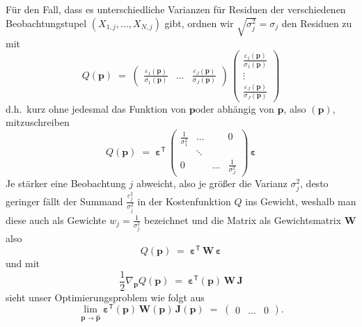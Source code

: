 Für den Fall, dass es unterschiedliche Varianzen für Residuen der verschiedenen Beobachtungstupel
$(X_{1,j},\dots,X_{N,j})$ gibt, ordnen wir $\sqrt{\sigma_j^2} = \sigma_j$ 
den Residuen zu mit
\begin{equation}
Q(\mathbf{p}) \; = \;
  \left(\begin{array}{ccc}
  \frac{\varepsilon_1(\mathbf{p})}{\sigma_1(\mathbf{p})} & \dots &
 \frac{\varepsilon_J(\mathbf{p})}{\sigma_J(\mathbf{p})} \end{array} \right)
\, \left(\begin{array}{c} \frac{\varepsilon_1(\mathbf{p})}{\sigma_1(\mathbf{p})}\\
 \vdots\\ \frac{\varepsilon_J(\mathbf{p})}{\sigma_J(\mathbf{p})}\end{array} \right)
\label{ZielfunktionalJmitW}
\end{equation}
d.h.\ kurz ohne jedesmal das \glqq Funktion von $\mathbf{p}$\grqq oder
\glqq abhängig von $\mathbf{p}$\grqq, also $(\mathbf{p})$,
mitzuschreiben
\begin{equation}
Q(\mathbf{p}) \; = \;
  \boldsymbol{\varepsilon}^\textsf{T}
\, \left(\begin{array}{cccc} \frac{1}{\sigma_1^2} & \dots & & 0 \\
  & \ddots & \\
 0 & & \dots &  \frac{1}{\sigma_J^2} \end{array} \right) \, \boldsymbol{\varepsilon}
\label{ZielfunktionalJmitW1}
\end{equation}
Je stärker eine Beobachtung $j$ abweicht, also je größer die Varianz $\sigma_j^2$,
desto geringer fällt der Summand $\frac{\varepsilon_j^2}{\sigma_j^2}$ in der Kostenfunktion $Q$
ins Gewicht, weshalb man diese auch als Gewichte $w_j = \frac{1}{\sigma_j^2}$ bezeichnet
und die Matrix als Gewichtsmatrix $\mathbf{W}$ also
\begin{equation}
Q(\mathbf{p}) \; = \;
  \boldsymbol{\varepsilon}^\textsf{T}
\, \mathbf{W} \, \boldsymbol{\varepsilon}
\label{ZielfunktionalJmitW2}
\end{equation}
und mit
\begin{equation}
\frac{1}{2} \nabla_{\mathbf{p}} Q(\mathbf{p})  \; = \; \boldsymbol{\varepsilon}^\textsf{T}(\mathbf{p})
 \, \mathbf{W} \, \boldsymbol{J}
\label{ZielfunktionalGradJW}
\end{equation}
sieht unser Optimierungsproblem wie folgt aus
\begin{equation}
\lim_{\mathbf{p} \rightarrow \mathbf{\hat p}}
\boldsymbol{\varepsilon}^\textsf{T}(\mathbf{p})
 \, \mathbf{W}(\mathbf{p}) \, \boldsymbol{J}(\mathbf{p})
 \; = \; \left(\begin{array}{ccc} 0 & \dots & 0 \end{array}\right) .
\label{ZielfunktionalGrad1W}
\end{equation}
